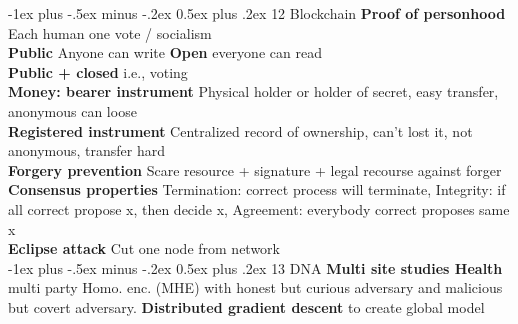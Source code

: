 \documentclass[10pt,landscape]{article}
\makeatletter
\renewcommand{\section}{\@startsection{section}{1}{0mm}%
                                {-1ex plus -.5ex minus -.2ex}%
                                {0.5ex plus .2ex}%
                                {\normalfont\large\bfseries}}
\makeatother
\begin{document}
\begin{multicols*}{4}
\section{12 Blockchain}
\textbf{Proof of personhood} Each human one vote / socialism\\
\textbf{Public} Anyone can write \textbf{Open} everyone can read\\
\textbf{Public + closed} i.e., voting\\
\textbf{Money: bearer instrument} Physical holder or holder of secret, easy transfer, anonymous can loose\\
\textbf{Registered instrument} Centralized record of ownership, can't lost it, not anonymous, transfer hard\\
\textbf{Forgery prevention} Scare resource + signature + legal recourse against forger\\
\textbf{Consensus properties} Termination: correct process will terminate, Integrity: if all correct propose x, then decide x, Agreement: everybody correct proposes same x\\
\textbf{Eclipse attack} Cut one node from network\\


\section{13 DNA}
\textbf{Multi site studies Health} multi party Homo. enc. (MHE) with honest but curious adversary and malicious but covert adversary.
\textbf{Distributed gradient descent} to create global model


\end{multicols*}
\end{document}
